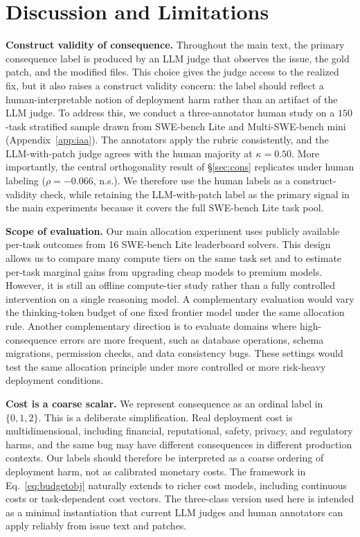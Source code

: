\documentclass{article}
\begin{document}
\section{Discussion and Limitations}
\label{sec:discussion}

\textbf{Construct validity of consequence.} Throughout the main text,
the primary consequence label is produced by an LLM judge that observes
the issue, the gold patch, and the modified files. This choice gives
the judge access to the realized fix, but it also raises a construct
validity concern: the label should reflect a human-interpretable notion
of deployment harm rather than an artifact of the LLM judge. To address
this, we conduct a three-annotator human study on a $150$-task
stratified sample drawn from SWE-bench Lite and Multi-SWE-bench mini
(Appendix~\ref{app:iaa}). The annotators apply the rubric consistently,
and the LLM-with-patch judge agrees with the human majority at
$\kappa = 0.50$. More importantly, the central orthogonality result of
\S\ref{sec:cons} replicates under human labeling
($\rho = -0.066$, n.s.). We therefore use the human labels as a
construct-validity check, while retaining the LLM-with-patch label as
the primary signal in the main experiments because it covers the full
SWE-bench Lite task pool.

\textbf{Scope of evaluation.} Our main allocation experiment uses
publicly available per-task outcomes from 16 SWE-bench Lite leaderboard
solvers. This design allows us to compare many compute tiers on the
same task set and to estimate per-task marginal gains from upgrading
cheap models to premium models. However, it is still an offline
compute-tier study rather than a fully controlled intervention on a
single reasoning model. A complementary evaluation would vary the
thinking-token budget of one fixed frontier model under the same
allocation rule. Another complementary direction is to evaluate
domains where high-consequence errors are more frequent, such as
database operations, schema migrations, permission checks, and data
consistency bugs. These settings would test the same allocation
principle under more controlled or more risk-heavy deployment
conditions.

\textbf{Cost is a coarse scalar.} We represent consequence as an
ordinal label in $\{0,1,2\}$. This is a deliberate simplification.
Real deployment cost is multidimensional, including financial,
reputational, safety, privacy, and regulatory harms, and the same bug
may have different consequences in different production contexts. Our
labels should therefore be interpreted as a coarse ordering of
deployment harm, not as calibrated monetary costs. The framework in
Eq.~\ref{eq:budgetobj} naturally extends to richer cost models,
including continuous costs or task-dependent cost vectors. The
three-class version used here is intended as a minimal instantiation
that current LLM judges and human annotators can apply reliably from
issue text and patches.
\end{document}
